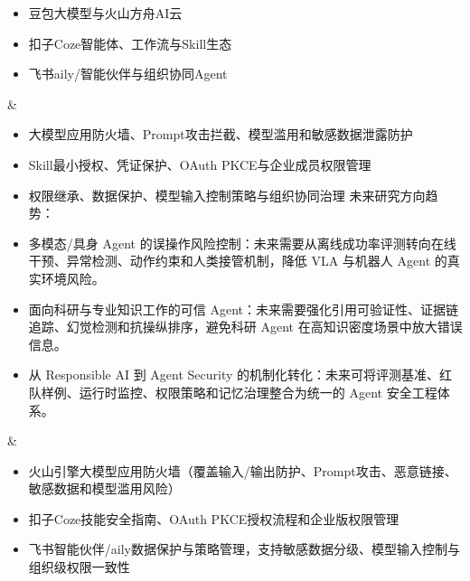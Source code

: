 \begin{longtblr}[
  caption = {我国主流 AI 智能体安全产品与落地方向},
  label   = {tab:china-agent-security-products-verified-cited},
]
\begin{itemize}[leftmargin=*,topsep=0pt,partopsep=0pt,itemsep=1pt,parsep=0pt]
    \item 豆包大模型与火山方舟AI云
    \item 扣子Coze智能体、工作流与Skill生态
    \item 飞书aily/智能伙伴与组织协同Agent
  \end{itemize}
& \begin{itemize}[leftmargin=*,topsep=0pt,partopsep=0pt,itemsep=1pt,parsep=0pt]
    \item 大模型应用防火墙、Prompt攻击拦截、模型滥用和敏感数据泄露防护
    \item Skill最小授权、凭证保护、OAuth PKCE与企业成员权限管理
    \item 权限继承、数据保护、模型输入控制策略与组织协同治理
    未来研究方向趋势：
    \item 多模态/具身 Agent 的误操作风险控制：未来需要从离线成功率评测转向在线干预、异常检测、动作约束和人类接管机制，降低 VLA 与机器人 Agent 的真实环境风险。~\cite{zhang2026uam,li2026handitloop}
    \item 面向科研与专业知识工作的可信 Agent：未来需要强化引用可验证性、证据链追踪、幻觉检测和抗操纵排序，避免科研 Agent 在高知识密度场景中放大错误信息。~\cite{he2025pasa}
    \item 从 Responsible AI 到 Agent Security 的机制化转化：未来可将评测基准、红队样例、运行时监控、权限策略和记忆治理整合为统一的 Agent 安全工程体系。~\cite{bytedanceseedresponsibleai2026,he2025pasa,zou2026taskmem,zhang2025functiontokens}


  \end{itemize}
& \begin{itemize}[leftmargin=*,topsep=0pt,partopsep=0pt,itemsep=1pt,parsep=0pt]
    \item 火山引擎大模型应用防火墙（覆盖输入/输出防护、Prompt攻击、恶意链接、敏感数据和模型滥用风险）~\cite{volcenginellmfirewall2026,volcenginesecuritywhitepaper2026}
    \item 扣子Coze技能安全指南、OAuth PKCE授权流程和企业版权限管理 ~\cite{cozeskillsecurity2026,cozeoauthpkce2026,volcenginecozepro2026}
    \item 飞书智能伙伴/aily数据保护与策略管理，支持敏感数据分级、模型输入控制与组织级权限一致性 ~\cite{feishuaily2026,feishuailydataprotection2026}
  \end{itemize} \\


\end{longtblr}
